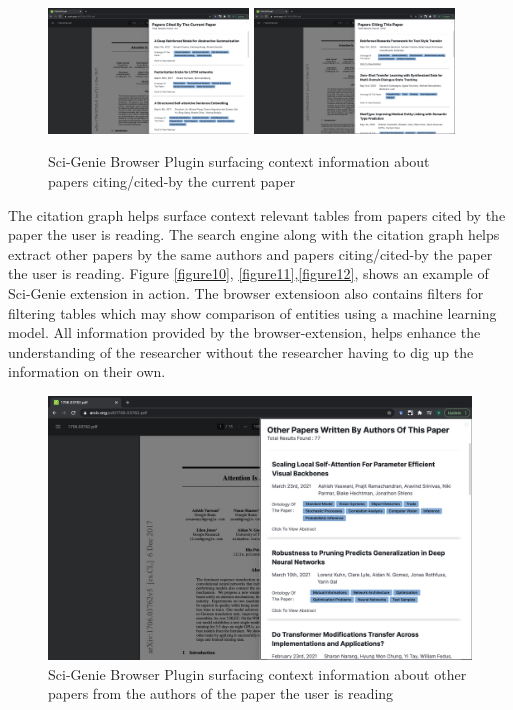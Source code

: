 \begin{figure}[h]
    \includegraphics[width=0.475\textwidth]{src/images/sci-genie-ext-cite-out-exp.png}
    \hfill
    \includegraphics[width=0.475\textwidth]{src/images/sci-genie-ext-cite-exp.png}
    \caption{ Sci-Genie Browser Plugin surfacing context information about papers citing/cited-by the current paper }
    \label{figure\arabic{figurecounter}}
\end{figure}

The citation graph helps surface context relevant tables from papers cited by the paper the user is reading.  The search engine along with the citation graph helps extract other papers by the same authors and papers citing/cited-by the paper the user is reading. Figure \ref{figure10}, \ref{figure11},\ref{figure12}, shows an example of Sci-Genie extension in action. The browser extensioon also contains filters for filtering tables which may show comparison of entities using a machine learning model. All information provided by the browser-extension, helps enhance the understanding of the researcher without the researcher having to dig up the information on their own. 

\begin{figure}[h]
    \centering
    \includegraphics[width=\maxwidth{\textwidth}]{src/images/sci-genie-ext-authors-exp.png}
    \caption{ Sci-Genie Browser Plugin surfacing context information about other papers from the authors of the paper the user is reading}
    \label{figure\arabic{figurecounter}}
\end{figure}

